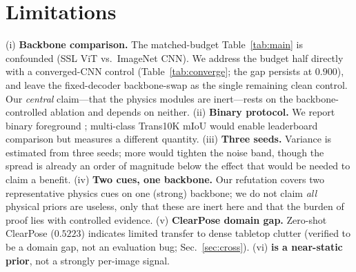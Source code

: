 \section{Limitations}
(i) \textbf{Backbone comparison.} The matched-budget Table~\ref{tab:main} is
confounded (SSL ViT vs.\ ImageNet CNN). We address the budget half directly with
a converged-CNN control (Table~\ref{tab:converge}; the gap persists at $0.900$),
and leave the fixed-decoder backbone-swap as the single remaining clean control.
Our \emph{central} claim---that the physics modules are inert---rests on the
backbone-controlled ablation and depends on neither.
(ii) \textbf{Binary protocol.} We report binary foreground \iou; multi-class
Trans10K mIoU would enable leaderboard comparison but measures a different
quantity. (iii) \textbf{Three seeds.} Variance is estimated from three seeds;
more would tighten the noise band, though the spread is already an order of
magnitude below the effect that would be needed to claim a benefit.
(iv) \textbf{Two cues, one backbone.} Our refutation covers two representative
physics cues on one (strong) backbone; we do not claim \emph{all} physical
priors are useless, only that these are inert here and that the burden of proof
lies with controlled evidence. (v) \textbf{ClearPose domain gap.} Zero-shot
ClearPose \iou{} ($0.5223$) indicates limited transfer to dense tabletop
clutter (verified to be a domain gap, not an evaluation bug; Sec.~\ref{sec:cross}).
(vi) \textbf{\brf{} is a near-static prior}, not a strongly per-image signal.

